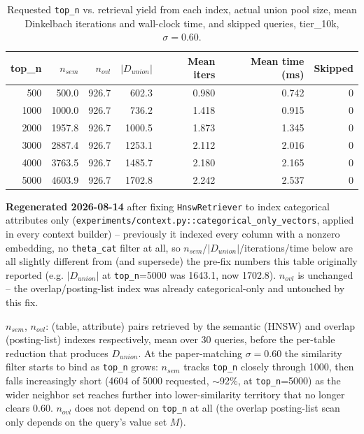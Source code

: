
\begin{table}[t]
\centering
\begin{threeparttable}
\caption{Requested \texttt{top\_n} vs. retrieval yield from each index, actual union pool size, mean Dinkelbach iterations and wall-clock time, and skipped queries, tier\_10k, $\sigma=0.60$.}
\label{tab:topn-vs-dunion-tier10k}
\begin{tabular}{rrrrrrr}
\toprule
top\_n & $n_{sem}$\tnote{a} & $n_{ovl}$\tnote{a} & $|D_{union}|$\tnote{b} & Mean iters\tnote{c} & Mean time (ms)\tnote{c} & Skipped\tnote{d} \\
\midrule
500 & 500.0 & 926.7 & 602.3 & 0.980 & 0.742 & 0 \\
1000 & 1000.0 & 926.7 & 736.2 & 1.418 & 0.915 & 0 \\
2000 & 1957.8 & 926.7 & 1000.5 & 1.873 & 1.345 & 0 \\
3000 & 2887.4 & 926.7 & 1253.1 & 2.112 & 2.016 & 0 \\
4000 & 3763.5 & 926.7 & 1485.7 & 2.180 & 2.165 & 0 \\
5000 & 4603.9 & 926.7 & 1702.8 & 2.242 & 2.537 & 0 \\
\bottomrule
\end{tabular}
\begin{tablenotes}
\footnotesize
\item[e] \textbf{Regenerated 2026-08-14} after fixing \texttt{HnswRetriever} to index categorical
  attributes only (\texttt{experiments/context.py::categorical\_only\_vectors}, applied in every
  context builder) -- previously it indexed every column with a nonzero embedding, no
  \texttt{theta\_cat} filter at all, so $n_{sem}$/$|D_{union}|$/iterations/time below are all
  slightly different from (and supersede) the pre-fix numbers this table originally reported
  (e.g. $|D_{union}|$ at \texttt{top\_n}=5000 was 1643.1, now 1702.8). $n_{ovl}$ is unchanged --
  the overlap/posting-list index was already categorical-only and untouched by this fix.
\item[a] $n_{sem}$, $n_{ovl}$: (table, attribute) pairs retrieved by the semantic (HNSW) and overlap (posting-list) indexes respectively, mean over 30 queries, before the per-table reduction that produces $D_{union}$. At the paper-matching $\sigma=0.60$ the similarity filter starts to bind as \texttt{top\_n} grows: $n_{sem}$ tracks \texttt{top\_n} closely through 1000, then falls increasingly short (4604 of 5000 requested, $\sim$92\%, at \texttt{top\_n}=5000) as the wider neighbor set reaches further into lower-similarity territory that no longer clears 0.60. $n_{ovl}$ does not depend on \texttt{top\_n} at all (the overlap posting-list scan only depends on the query's value set $M$).

\end{tablenotes}
\end{threeparttable}
\end{table}
